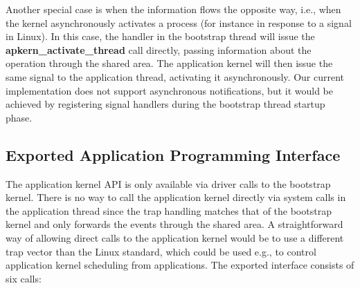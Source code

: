 Another special case is when the information flows the opposite way, i.e.,
when the kernel asynchronously activates a process (for instance in response
to a signal in Linux). In this case, the handler in the bootstrap thread will
issue the \textbf{apkern\_activate\_thread} call directly, passing information
about the operation through the shared area. The application kernel will then
issue the same signal to the application thread, activating it asynchronously.
\label{fix:signal_handlers}Our current implementation does not support
asynchronous notifications, but it would be achieved by registering signal
handlers during the bootstrap thread startup phase.


\subsection{Exported Application Programming Interface}
The application kernel API is only available via driver calls to the bootstrap
kernel. There is no way to call the application kernel directly via system
calls in the application thread since the trap handling matches that of the
bootstrap kernel and only forwards the events through the shared area. A
straightforward way of allowing direct calls to the application kernel would
be to use a different trap vector\label{fix:trap_vector} than the Linux
standard, which could be used e.g., to control application kernel scheduling
from applications. The exported interface consists of six calls:

